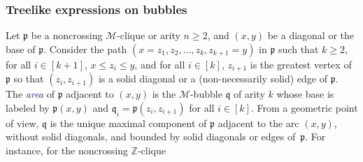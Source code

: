 \documentclass[10pt,reqno]{amsart}
\numberwithin{equation}{subsection}
\renewcommand{\leq}{\leqslant}
\renewcommand{\geq}{\geqslant}
\newcommand{\Z}{\mathbb{Z}}
\newcommand{\Mca}{\mathcal{M}}
\newcommand{\Pfr}{\mathfrak{p}}
\newcommand{\Qfr}{\mathfrak{q}}
\newcommand{\Def}[1]{\textcolor{MidnightBlue}{\em #1}}
\begin{document}
\subsubsection{Treelike expressions on bubbles}
\label{subsubsec:treelike_bubbles}
Let $\Pfr$ be a noncrossing $\Mca$-clique or arity $n \geq 2$, and
$(x, y)$ be a diagonal or the base of $\Pfr$. Consider the path
$(x = z_1, z_2, \dots, z_k, z_{k + 1} = y)$ in $\Pfr$ such that
$k \geq 2$, for all $i \in [k + 1]$, $x \leq z_i \leq y$, and for all
$i \in [k]$, $z_{i + 1}$ is the greatest vertex of $\Pfr$ so that
$(z_i, z_{i + 1})$ is a solid diagonal or a (non-necessarily solid) edge
of $\Pfr$. The \Def{area} of $\Pfr$ adjacent to $(x, y)$ is the
$\Mca$-bubble $\Qfr$ of arity $k$ whose base is labeled by $\Pfr(x, y)$
and $\Qfr_i = \Pfr(z_i, z_{i + 1})$ for all $i \in [k]$. From a
geometric point of view, $\Qfr$ is the unique maximal component of
$\Pfr$ adjacent to the arc $(x, y)$, without solid diagonals, and
bounded by solid diagonals or edges of~$\Pfr$. For instance, for the
noncrossing $\Z$-clique
\end{document}
